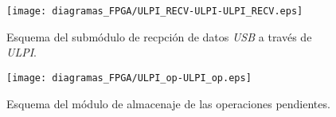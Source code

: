 \begin{figure}[p]
    \centering
    \texttt{[image: diagramas\_FPGA/ULPI\_RECV-ULPI-ULPI\_RECV.eps]}
    \caption{Esquema del submódulo de recpción de datos \emph{USB} a través de \emph{ULPI}.}
    \label{fig:diagrama_fgpa_ulpi_recv}
\end{figure}

\begin{figure}[p]
    \centering
    \texttt{[image: diagramas\_FPGA/ULPI\_op-ULPI\_op.eps]}
    \caption{Esquema del módulo de almacenaje de las operaciones pendientes.}
    \label{fig:diagrama_fgpa_op}
\end{figure}